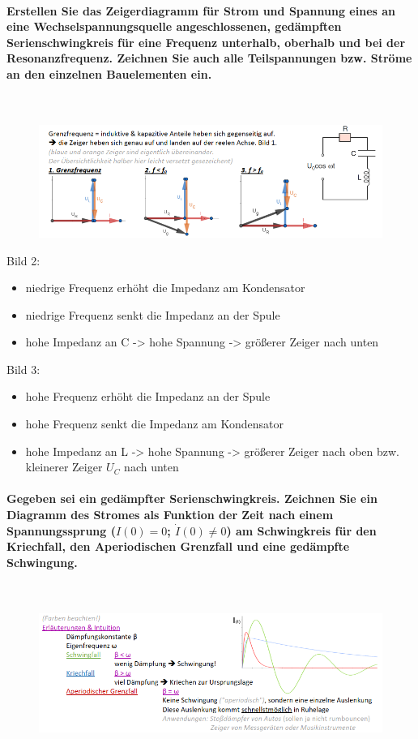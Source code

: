 \documentclass[a4paper, 11pt, ngerman, parskip=half-]{scrartcl}
\begin{document}
\paragraph{Erstellen Sie das Zeigerdiagramm für Strom und Spannung eines an eine
    Wechselspannungsquelle angeschlossenen, gedämpften Serienschwingkreis für eine Frequenz unterhalb,
    oberhalb und bei der Resonanzfrequenz. Zeichnen Sie auch alle Teilspannungen bzw. Ströme an den
    einzelnen Bauelementen ein.} ~
\begin{figure}[H]
    \centering
    \includegraphics[width=\textwidth]{image/12/3.png}
\end{figure}
Bild 2:
\begin{itemize}
    \item niedrige Frequenz erhöht die Impedanz am Kondensator
    \item niedrige Frequenz senkt die Impedanz an der Spule
    \item hohe Impedanz an C -> hohe Spannung -> größerer Zeiger nach unten
\end{itemize}
Bild 3:
\begin{itemize}
    \item hohe Frequenz erhöht die Impedanz an der Spule
    \item hohe Frequenz senkt die Impedanz am Kondensator
    \item hohe Impedanz an L -> hohe Spannung -> größerer Zeiger nach oben bzw. kleinerer Zeiger $U_C$ nach unten
\end{itemize}

\paragraph{Gegeben sei ein gedämpfter Serienschwingkreis. Zeichnen Sie ein Diagramm des Stromes als
    Funktion der Zeit nach einem Spannungssprung ($I(0)=0$; $\dot{I}(0)\neq 0$) am Schwingkreis für den
    Kriechfall, den Aperiodischen Grenzfall und eine gedämpfte Schwingung.} ~
\begin{figure}[H]
    \centering
    \includegraphics[width=\textwidth]{image/12/4.png}
\end{figure}
\end{document}
